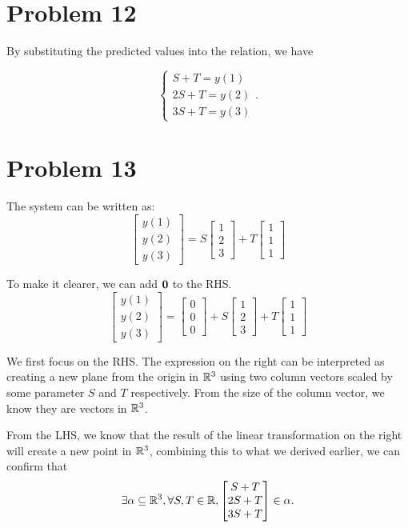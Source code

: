 \documentclass[12pt,a4paper]{article}
\begin{document}
\section*{Problem 12}
By substituting the predicted values into the relation, we have
\begin{solution}
\[
\begin{cases}
    S + T = y(1)\\
    2S + T = y(2)\\
    3S + T = y(3)
\end{cases}.
\]
\end{solution}

\section*{Problem 13}
\begin{solution}
The system can be written as:
\[
\begin{bmatrix}
y(1) \\
y(2) \\
y(3)
\end{bmatrix}
=
S \begin{bmatrix}
1 \\
2 \\
3
\end{bmatrix}
+
T \begin{bmatrix}
1 \\
1 \\
1
\end{bmatrix}
\]

To make it clearer, we can add $\mathbf{0}$ to the RHS.
\[
\begin{bmatrix}
y(1) \\
y(2) \\
y(3)
\end{bmatrix}
=
\begin{bmatrix}
0 \\
0 \\
0
\end{bmatrix}
+
S \begin{bmatrix}
1 \\
2 \\
3
\end{bmatrix}
+
T \begin{bmatrix}
1 \\
1 \\
1
\end{bmatrix}
\]

We first focus on the RHS. The expression on the right can be interpreted as creating a new plane from the origin in $\mathbb{R}^3$ using two column vectors scaled by some parameter $S$ and $T$ respectively. From the size of the column vector, we know they are vectors in $\mathbb{R}^3$.

From the LHS, we know that the result of the linear transformation on the right will create a new point in $\mathbb{R}^3$, combining this to what we derived earlier, we can confirm that
\[
\exists \alpha \subseteq \mathbb{R}^3, \forall S, T \in \mathbb{R}, 
\begin{bmatrix}
    S + T\\ 2S + T\\ 3S+T
\end{bmatrix}
\in \alpha.
\]
\end{solution}
\end{document}
